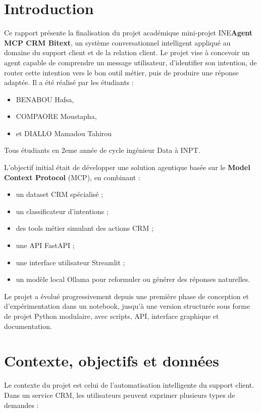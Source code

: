 \documentclass[12pt,a4paper]{report}
\begin{document}
\tableofcontents
\newpage

\chapter*{Introduction}

Ce rapport présente la finalisation du projet académique mini-projet INE\textbf{Agent MCP CRM Bitext}, un système conversationnel intelligent appliqué au domaine du support client et de la relation client. Le projet vise à concevoir un agent capable de comprendre un message utilisateur, d'identifier son intention, de router cette intention vers le bon outil métier, puis de produire une réponse adaptée.
Il a été réalisé par les étudiants : 
\begin{itemize}
    \item BENABOU Hafsa,
    \item COMPAORE Moustapha,
    \item et DIALLO Mamadou Tahirou
\end{itemize}
Tous étudiants en 2eme année de cycle ingénieur Data à INPT.

L'objectif initial était de développer une solution agentique basée sur le \textbf{Model Context Protocol} (MCP), en combinant :

\begin{itemize}
    \item un dataset CRM spécialisé ;
    \item un classificateur d'intentions ;
    \item des tools métier simulant des actions CRM ;
    \item une API FastAPI ;
    \item une interface utilisateur Streamlit ;
    \item un modèle local Ollama pour reformuler ou générer des réponses naturelles.
\end{itemize}

Le projet a évolué progressivement depuis une première phase de conception et d'expérimentation dans un notebook, jusqu'à une version structurée sous forme de projet Python modulaire, avec scripts, API, interface graphique et documentation.

\chapter{Contexte, objectifs et données}

Le contexte du projet est celui de l'automatisation intelligente du support client. Dans un service CRM, les utilisateurs peuvent exprimer plusieurs types de demandes :
\end{document}

